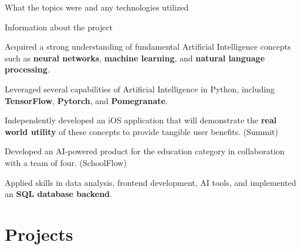 \documentclass[letterpaper,10pt]{article}
\begin{document}
  \begin{resume_list}
    \item What the topics were and any technologies utilized
    \vspace{1pt}
    \item Information about the project 
    \vspace{2pt}
  \end{resume_list}

  \begin{resume_list}
    \item Acquired a strong understanding of fundamental Artificial Intelligence concepts such as \textbf{neural networks}, \textbf{machine learning}, and \textbf{natural language processing}.
    \vspace{1pt}
    \item Leveraged several capabilities of Artificial Intelligence in Python, including \textbf{TensorFlow}, \textbf{Pytorch}, and \textbf{Pomegranate}.
    \vspace{1pt}
    \item Independently developed an iOS application that will demonstrate the \textbf{real world utility} of these concepts to provide tangible user benefits. (Summit)
    \vspace{2pt}
  \end{resume_list}

  \begin{resume_list}
    \item Developed an AI-powered product for the education category in collaboration with a team of four. (SchoolFlow)
    \vspace{1pt}
    \item Applied skills in data analysis, frontend development, AI tools, and implemented an \textbf{SQL database backend}.
    \vspace{-2pt}
  \end{resume_list}

  \section{\large{Projects}}
\end{document}
